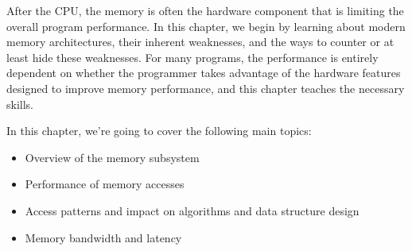 After the CPU, the memory is often the hardware component that is limiting the overall program performance. In this chapter, we begin by learning about modern memory architectures, their inherent weaknesses, and the ways to counter or at least hide these weaknesses. For many programs, the performance is entirely dependent on whether the programmer takes advantage of the hardware features designed to improve memory performance, and this chapter teaches the necessary skills.

In this chapter, we're going to cover the following main topics:

\begin{itemize}
\item Overview of the memory subsystem
\item Performance of memory accesses
\item Access patterns and impact on algorithms and data structure design
\item Memory bandwidth and latency
\end{itemize}
























